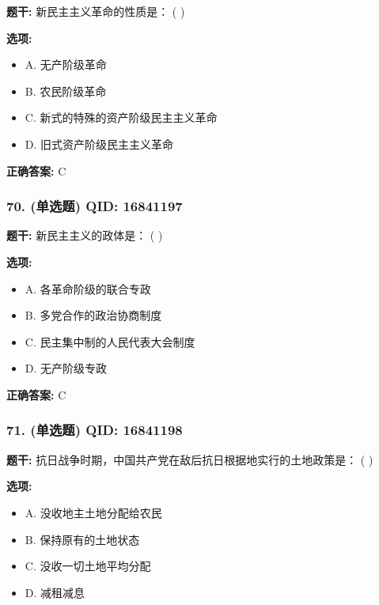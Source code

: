 \documentclass[12pt,UTF8]{ctexart}
\begin{document}
\textbf{题干:}
新民主主义革命的性质是： ( )

\textbf{选项:}
\begin{itemize}[leftmargin=*]

  \item A. 无产阶级革命

  \item B. 农民阶级革命

  \item C. 新式的特殊的资产阶级民主主义革命

  \item D. 旧式资产阶级民主主义革命

\end{itemize}

\textbf{正确答案:}
C

\vspace{0.3em}\hrulefill\vspace{0.7em}

\subsubsection*{70. (单选题) \small QID: 16841197}

\textbf{题干:}
新民主主义的政体是： ( )

\textbf{选项:}
\begin{itemize}[leftmargin=*]

  \item A. 各革命阶级的联合专政

  \item B. 多党合作的政治协商制度

  \item C. 民主集中制的人民代表大会制度

  \item D. 无产阶级专政

\end{itemize}

\textbf{正确答案:}
C

\vspace{0.3em}\hrulefill\vspace{0.7em}

\subsubsection*{71. (单选题) \small QID: 16841198}

\textbf{题干:}
抗日战争时期，中国共产党在敌后抗日根据地实行的土地政策是： ( )

\textbf{选项:}
\begin{itemize}[leftmargin=*]

  \item A. 没收地主土地分配给农民

  \item B. 保持原有的土地状态

  \item C. 没收一切土地平均分配

  \item D. 减租减息

\end{itemize}
\end{document}
